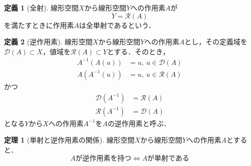 \documentclass[11pt,a4paper,titlepage]{jsreport}
\theoremstyle{definition}
\newtheorem{dfn}{定義}
\newtheorem{thm}{定理}
\begin{document}
\begin{dfn}[全射]
  \label{dfn:全射}
  線形空間$X$から線形空間$Y$への作用素$A$が
  \begin{equation*}
    Y=\mathcal{R}(A)
  \end{equation*}
  を満たすときに作用素$A$は全単射であるという．
\end{dfn}

\begin{dfn}[逆作用素]
  \label{dfn:逆作用素}
  線形空間$X$から線形空間$Y$への作用素$A$とし，その定義域を$\mathcal{D}(A)\subset X$，値域を$\mathcal{R}(A)\subset Y$とする．そのとき，
  \begin{align*}
    A^{-1}\left( A\left( u \right) \right) & =u, \  u\in\mathcal{D}\left( A \right) \\
    A(A^{-1}(u))                           & =u, \  u\in\mathcal{R}(A)
  \end{align*}
  かつ
  \begin{align*}
    \mathcal{D}(A^{-1}) & =\mathcal{R}(A) \\
    \mathcal{R}(A^{-1}) & =\mathcal{D}(A)
  \end{align*}
  となる$Y$から$X$への作用素$A^{-1}$を$A$の逆作用素と呼ぶ．
\end{dfn}

\begin{thm}[単射と逆作用素の関係]
  \label{thm:単射と逆作用素の関係}
  線形空間$X$から線形空間$Y$への作用素$A$とすると．
  \begin{equation*}
    Aが逆作用素を持つ \Leftrightarrow Aが単射である
  \end{equation*}
\end{thm}
\end{document}
